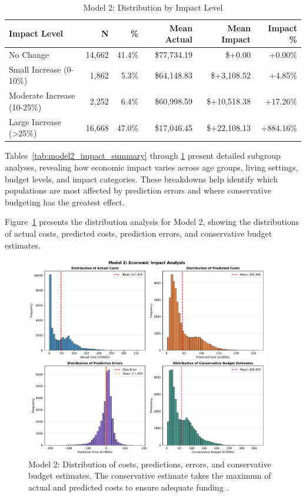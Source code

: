 \begin{table}[htbp]
\centering
\small
\caption{Model 2: Distribution by Impact Level \FiscalYear}
\label{tab:model2_impact_distribution}
\begin{tabular}{lrrrrr}
\toprule
\textbf{Impact Level} & \textbf{N} & \textbf{\%} & \textbf{Mean Actual} & \textbf{Mean Impact} & \textbf{Impact \%} \\
\midrule
No Change & 14,662 & 41.4\% & \$77,734.19 & \$+0.00 & +0.00\% \\
Small Increase (0-10\%) & 1,862 & 5.3\% & \$64,148.83 & \$+3,108.52 & +4.85\% \\
Moderate Increase (10-25\%) & 2,252 & 6.4\% & \$60,998.59 & \$+10,518.38 & +17.26\% \\
Large Increase (>25\%) & 16,668 & 47.0\% & \$17,046.45 & \$+22,108.13 & +884.16\% \\
\bottomrule
\end{tabular}
\end{table}

Tables~\ref{tab:model2_impact_summary} through \ref{tab:model2_impact_distribution} present detailed subgroup analyses, revealing how economic impact varies across age groups, living settings, budget levels, and impact categories. These breakdowns help identify which populations are most affected by prediction errors and where conservative budgeting has the greatest effect.

Figure~\ref{fig:model2_impact_histograms} presents the distribution analysis for Model 2, showing the distributions of actual costs, predicted costs, prediction errors, and conservative budget estimates.

\begin{figure}[htbp]
\centering
\includegraphics[width=0.95\textwidth]{figures/model_2_Impact_Histograms.pdf}
\caption{Model 2: Distribution of costs, predictions, errors, and conservative budget estimates. The conservative estimate takes the maximum of actual and predicted costs to ensure adequate funding \FiscalYear.}
\label{fig:model2_impact_histograms}
\end{figure}

